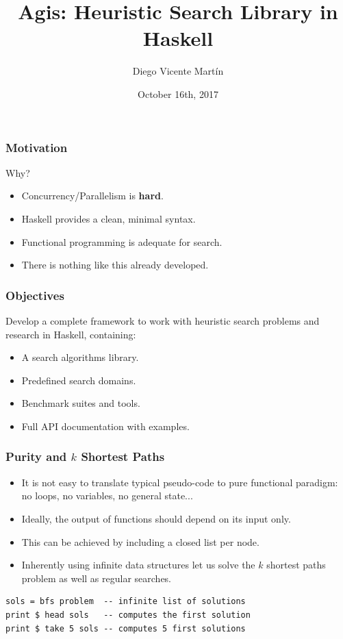 \documentclass{beamer}
\title[Agis: Search in Haskell]{Agis: Heuristic Search Library in Haskell}
\author[Diego Vicente]{Diego Vicente Martín}
\institute{Universidad Carlos III de Madrid}
\date{October 16th, 2017}
\begin{document}
\frame{\titlepage}

\begin{frame}
  \frametitle{Motivation}
  Why?
  \begin{itemize}
  \item Concurrency/Parallelism is \textbf{hard}.
  \item Haskell provides a clean, minimal syntax.
  \item Functional programming is adequate for search.
  \item There is nothing like this already developed.
  \end{itemize}
\end{frame}

\begin{frame}
  \frametitle{Objectives}
  Develop a complete framework to work with heuristic search problems and
  research in Haskell, containing:
  \begin{itemize}
  \item A search algorithms library.
  \item Predefined search domains.
  \item Benchmark suites and tools.
  \item Full API documentation with examples.
  \end{itemize}
\end{frame}

\begin{frame}[fragile]
  \frametitle{Purity and $k$ Shortest Paths}
  \begin{itemize}
  \item It is not easy to translate typical pseudo-code to pure functional
    paradigm: no loops, no variables, no general state...
  \item Ideally, the output of functions should depend on its input only.
  \item This can be achieved by including a closed list per node.
  \item Inherently using infinite data structures let us solve the $k$ shortest
    paths problem as well as regular searches.
  \end{itemize}

\begin{lstlisting}[style=haskell]
sols = bfs problem  -- infinite list of solutions
print $ head sols   -- computes the first solution
print $ take 5 sols -- computes 5 first solutions
\end{lstlisting}
\end{frame}
\end{document}
